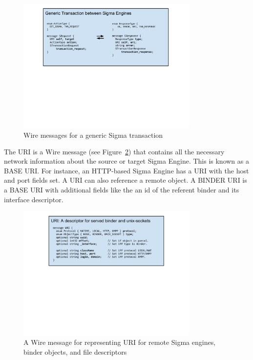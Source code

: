 \documentclass[prodmode]{acmlarge}
\begin{document}
\begin{figure}[h!]
\centering
\includegraphics[width=0.8\textwidth]{drawings/WireTransaction.pdf}
\caption{Wire messages for a generic Sigma transaction}
\label{fig:GenericSigmaTransaction}
\end{figure}

The URI is a Wire message (see Figure~\ref{fig:WireURI}) that contains all the necessary network information about the source or target Sigma Engine. This is known as a BASE URI. For instance, an HTTP-based Sigma Engine has a URI with the host and port fields set. A URI can also reference a remote object. A BINDER URI is a BASE URI with additional fields like the an id of the referent binder and its interface descriptor.

\begin{figure}[h!]
\centering
\includegraphics[width=0.8\textwidth]{drawings/WireURI.pdf}
\caption{A Wire message for representing URI for remote Sigma engines, binder objects, and file descriptors}
\label{fig:WireURI}
\end{figure}
\end{document}
